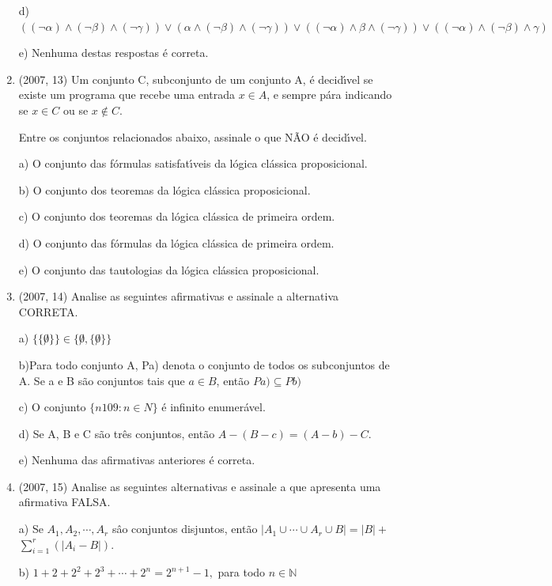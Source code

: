 \documentclass{article}
\begin{document}
\begin{enumerate}
d) $((\neg \alpha) \wedge(\neg \beta) \wedge(\neg \gamma)) \vee(\alpha \wedge(\neg \beta) \wedge(\neg \gamma)) \vee((\neg \alpha) \wedge \beta \wedge(\neg \gamma)) \vee((\neg \alpha) \wedge(\neg \beta) \wedge \gamma)$

e) Nenhuma destas respostas é correta.\newline


\item(2007, 13) Um conjunto C, subconjunto de um conjunto A, é decidı́vel se existe um programa que recebe uma entrada $x \in A$, e sempre pára indicando se $x \in C$ ou se $x \notin C$.

Entre os conjuntos relacionados abaixo, assinale o que NÃO é decidı́vel.

a) O conjunto das fórmulas satisfatı́veis da lógica clássica proposicional.

b) O conjunto dos teoremas da lógica clássica proposicional.

c) O conjunto dos teoremas da lógica clássica de primeira ordem.

d) O conjunto das fórmulas da lógica clássica de primeira ordem.

e) O conjunto das tautologias da lógica clássica proposicional.\newline


\item(2007, 14) Analise as seguintes afirmativas e assinale a alternativa CORRETA.

a) $\{\{ \not 0 \}\} \in \{ \not 0,\{\not 0 \}\}$

b)Para todo conjunto A, Pa) denota o conjunto de todos os subconjuntos de A. Se a e B são conjuntos tais que $a \in B$, então $Pa) \subseteq Pb)$

c) O conjunto $\{n 109 : n ∈ N\}$ é infinito enumerável.

d) Se A, B e C são três conjuntos, então $A − (B - c) = (A - b) - C.$

e) Nenhuma das afirmativas anteriores é correta.\newline



\item(2007, 15) Analise as seguintes alternativas e assinale a que apresenta uma afirmativa FALSA.

a) Se $A_{1}, A_{2}, \cdots, A_{r}$ sâo conjuntos disjuntos, então $\left|A_{1} \cup \cdots \cup A_{r} \cup B\right|=|B|+$
$\sum_{i=1}^{r}\left(\left|A_{i}-B\right|\right) .$

b) $1+2+2^{2}+2^{3}+\cdots+2^{n}=2^{n+1}-1,$ para todo $n \in \mathbb{N}$


\end{enumerate}
\end{document}
